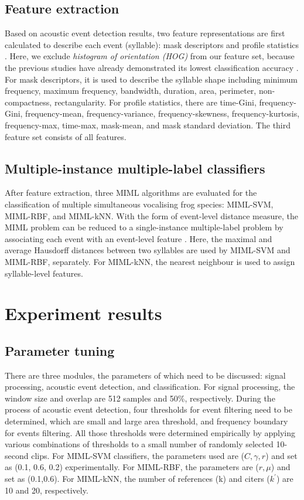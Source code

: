 \subsection{Feature extraction}
Based on acoustic event detection results, two feature representations are first calculated to describe each event (syllable): mask descriptors and profile statistics \cite{briggs2012acoustic}. Here, we exclude \textit{histogram of orientation (HOG)} from our feature set, because the previous studies have already demonstrated its lowest classification accuracy \cite{briggs2012acoustic, ruizmultiple2015}. For mask descriptors, it is used to describe the syllable shape including minimum frequency, maximum frequency, bandwidth, duration, area, perimeter, non-compactness, rectangularity. For profile statistics, there are time-Gini, frequency-Gini, frequency-mean, frequency-variance, frequency-skewness, frequency-kurtosis, frequency-max, time-max, mask-mean, and mask standard deviation. The third feature set consists of all features.







\subsection{Multiple-instance multiple-label classifiers}
After feature extraction, three MIML algorithms are evaluated for the classification of multiple simultaneous vocalising frog species: MIML-SVM, MIML-RBF, and MIML-kNN. With the form of event-level distance measure, the MIML problem can be reduced to a single-instance multiple-label problem by associating each event with an event-level feature \cite{briggs2012acoustic}. Here, the maximal and average Hausdorff distances between two syllables are used by MIML-SVM and MIML-RBF, separately. For MIML-kNN, the nearest neighbour is used to assign syllable-level features. 


\section{Experiment results}

\subsection{Parameter tuning}
There are three modules, the parameters of which need to be discussed: signal processing, acoustic event detection, and classification. For signal processing, the window size and overlap are 512 samples and 50\%, respectively. During the process of acoustic event detection, four thresholds for event filtering need to be determined, which are small and large area threshold, and frequency boundary for events filtering. All those thresholds were determined empirically by applying various combinations of thresholds to a small number of randomly selected 10-second clips. For MIML-SVM classifiers, the parameters used are ($C,\gamma,r$) and set as (0.1, 0.6, 0.2) experimentally. For MIML-RBF, the parameters are ($ r, \mu$) and set as (0.1,0.6). For MIML-kNN, the number of references (k) and citers ($k^{'}$) are 10 and 20, respectively.
 
